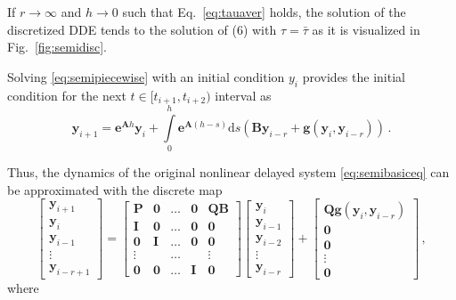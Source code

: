 \documentclass[preprint,12pt]{elsarticle}
\begin{document}
	If $r\rightarrow \infty$ and $h \rightarrow 0$ such that Eq.~\eqref{eq:tauaver} holds, the solution of the discretized DDE tends to the solution of (6) with $\tau=\bar{\tau}$ as it is visualized in Fig.~\ref{fig:semidisc}.
	
	Solving \eqref{eq:semipiecewise} with an initial condition $y_i$ provides the initial condition for the next $t\in[t_{i+1},t_{i+2})$ interval as
	\begin{equation}
	\mathbf{y}_{i+1}=\mathbf{e}^{\mathbf{A}h}\mathbf{y}_i+ \int\limits_0^h \mathbf{e}^{\mathbf{A}(h-s)}\mathrm{d}s (\mathbf{B} \mathbf{y}_{i-r}+\mathbf{g}(\mathbf{y}_i,\mathbf{y}_{i-r}))\,.
	\end{equation}
	
	Thus, the dynamics of the original nonlinear delayed system \eqref{eq:semibasiceq} can be approximated with the discrete map
	\begin{equation} \label{eq:semidiscmap}
	\begin{bmatrix}
	\mathbf{y}_{i+1}\\
	\mathbf{y}_{i}\\
	\mathbf{y}_{i-1}\\
	\vdots \\
	\mathbf{y}_{i-r+1}
	\end{bmatrix} = 
	\begin{bmatrix}
	\mathbf{P}&\mathbf{0}&\dots&\mathbf{0}&\mathbf{Q}\mathbf{B}\\
	\mathbf{I}&\mathbf{0}&\dots&\mathbf{0}&\mathbf{0}\\
	\mathbf{0}&\mathbf{I}&\dots&\mathbf{0}&\mathbf{0}\\
	\vdots&&\dots&&\vdots\\
	\mathbf{0}&\mathbf{0}&\dots&\mathbf{I}&\mathbf{0}
	\end{bmatrix}
	\begin{bmatrix}
	\mathbf{y}_{i}\\
	\mathbf{y}_{i-1}\\
	\mathbf{y}_{i-2}\\
	\vdots \\
	\mathbf{y}_{i-r}
	\end{bmatrix}
	+
	\begin{bmatrix}
	\mathbf{Q}\mathbf{g}(\mathbf{y}_i,\mathbf{y}_{i-r})\\
	\mathbf{0}\\
	\mathbf{0}\\
	\vdots \\
	\mathbf{0}
	\end{bmatrix}\,,
	\end{equation}
	where
	
\end{document}
